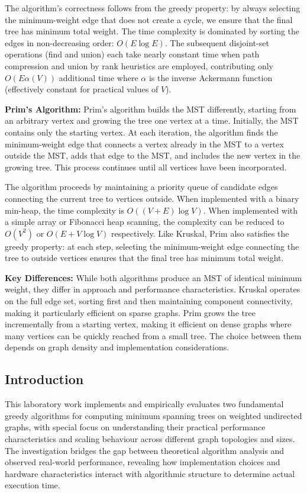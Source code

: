 ﻿\documentclass[12pt]{article}
\begin{document}
The algorithm's correctness follows from the greedy property: by always selecting the minimum-weight edge that does not create a cycle, we ensure that the final tree has minimum total weight. The time complexity is dominated by sorting the edges in non-decreasing order: $O(E \log E)$. The subsequent disjoint-set operations (find and union) each take nearly constant time when path compression and union by rank heuristics are employed, contributing only $O(E \alpha(V))$ additional time where $\alpha$ is the inverse Ackermann function (effectively constant for practical values of $V$).

\textbf{Prim's Algorithm:} Prim's algorithm builds the MST differently, starting from an arbitrary vertex and growing the tree one vertex at a time. Initially, the MST contains only the starting vertex. At each iteration, the algorithm finds the minimum-weight edge that connects a vertex already in the MST to a vertex outside the MST, adds that edge to the MST, and includes the new vertex in the growing tree. This process continues until all vertices have been incorporated.

The algorithm proceeds by maintaining a priority queue of candidate edges connecting the current tree to vertices outside. When implemented with a binary min-heap, the time complexity is $O((V + E) \log V)$. When implemented with a simple array or Fibonacci heap scanning, the complexity can be reduced to $O(V^2)$ or $O(E + V \log V)$ respectively. Like Kruskal, Prim also satisfies the greedy property: at each step, selecting the minimum-weight edge connecting the tree to outside vertices ensures that the final tree has minimum total weight.

\textbf{Key Differences:} While both algorithms produce an MST of identical minimum weight, they differ in approach and performance characteristics. Kruskal operates on the full edge set, sorting first and then maintaining component connectivity, making it particularly efficient on sparse graphs. Prim grows the tree incrementally from a starting vertex, making it efficient on dense graphs where many vertices can be quickly reached from a small tree. The choice between them depends on graph density and implementation considerations.

\subsection{Introduction}


This laboratory work implements and empirically evaluates two fundamental greedy algorithms for computing minimum spanning trees on weighted undirected graphs, with special focus on understanding their practical performance characteristics and scaling behaviour across different graph topologies and sizes. The investigation bridges the gap between theoretical algorithm analysis and observed real-world performance, revealing how implementation choices and hardware characteristics interact with algorithmic structure to determine actual execution time.
\end{document}
